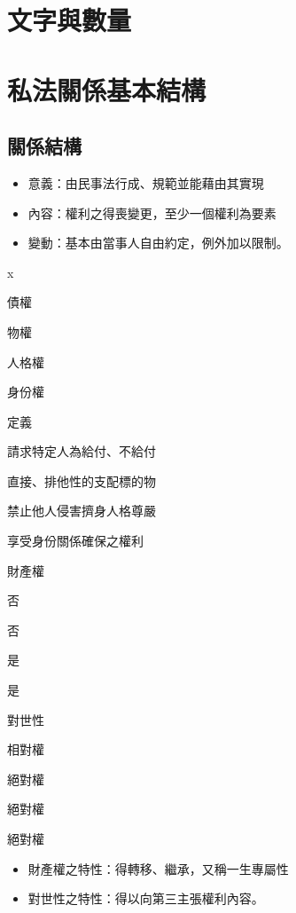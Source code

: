\documentclass[
]{book}
\begin{document}
\hypertarget{ux6587ux5b57ux8207ux6578ux91cf}{%
\chapter{文字與數量}\label{ux6587ux5b57ux8207ux6578ux91cf}}

\hypertarget{ux79c1ux6cd5ux95dcux4fc2ux57faux672cux7d50ux69cb}{%
\chapter{私法關係基本結構}\label{ux79c1ux6cd5ux95dcux4fc2ux57faux672cux7d50ux69cb}}

\hypertarget{ux95dcux4fc2ux7d50ux69cb}{%
\section{關係結構}\label{ux95dcux4fc2ux7d50ux69cb}}

\begin{itemize}
\item
  意義：由民事法行成、規範並能藉由其實現
\item
  內容：權利之得喪變更，至少一個權利為要素
\item
  變動：基本由當事人自由約定，例外加以限制。
\end{itemize}

x

債權

物權

人格權

身份權

定義

請求特定人為給付、不給付

直接、排他性的支配標的物

禁止他人侵害擠身人格尊嚴

享受身份關係確保之權利

財產權

否

否

是

是

對世性

相對權

絕對權

絕對權

絕對權

\begin{itemize}
\item
  財產權之特性：得轉移、繼承，又稱一生專屬性
\item
  對世性之特性：得以向第三主張權利內容。
\end{itemize}
\end{document}
